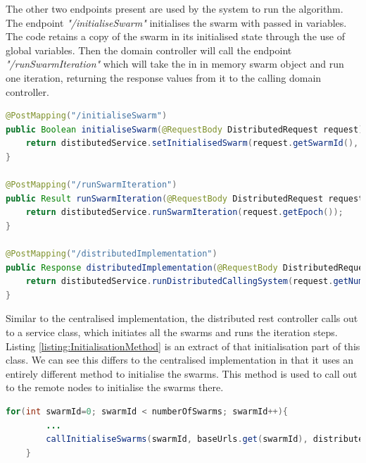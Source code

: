 \documentclass[oneside,12pt]{book}
\begin{document}
The other two endpoints present are used by the system to run the algorithm. The endpoint \textit{"/initialiseSwarm"} initialises the swarm with passed in variables. The code retains a copy of the swarm in its initialised state through the use of global variables. Then the domain controller will call the endpoint \textit{"/runSwarmIteration"} which will take the in in memory swarm object and run one iteration, returning the response values from it to the calling domain controller.

\begin{lstlisting}[basicstyle=\footnotesize, language=Java]
 @PostMapping("/initialiseSwarm")
public Boolean initialiseSwarm(@RequestBody DistributedRequest request) throws Exception {
    return distibutedService.setInitialisedSwarm(request.getSwarmId(), request.getNumberOfParticles(), request.getConfigVariables());
}

@PostMapping("/runSwarmIteration")
public Result runSwarmIteration(@RequestBody DistributedRequest request) {
    return distibutedService.runSwarmIteration(request.getEpoch());
}

@PostMapping("/distributedImplementation")
public Response distributedImplementation(@RequestBody DistributedRequest request) {
    return distibutedService.runDistributedCallingSystem(request.getNumberOfParticles(), request.getBaseUrls(), request.getConfigVariables());
}
\end{lstlisting}
\label{listing:DistributedRestController}

Similar to the centralised implementation, the distributed rest controller calls out to a service class, which initiates all the swarms and runs the iteration steps. Listing \ref{listing:InitialisationMethod} is an extract of that initialisation part of this class. We can see this differs to the centralised implementation in that it uses an entirely different method to initialise the swarms. This method is used to call out to the remote nodes to initialise the swarms there.

\begin{lstlisting}[basicstyle=\footnotesize, language=Java]
    for(int swarmId=0; swarmId < numberOfSwarms; swarmId++){
        ...
        callInitialiseSwarms(swarmId, baseUrls.get(swarmId), distributedRequest);
    }
\end{lstlisting}
\label{listing:InitialisationMethod}
\end{document}
